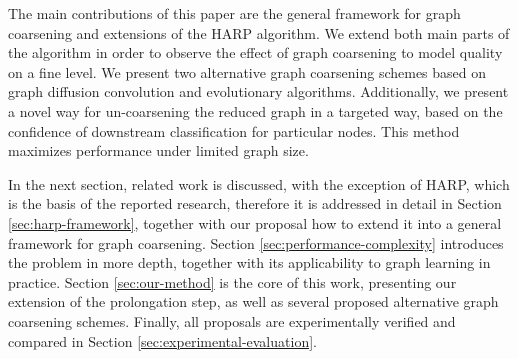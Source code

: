 The main contributions of this paper are the general framework for graph coarsening and extensions of the HARP algorithm. We extend both main parts of the algorithm in order to observe the effect of graph coarsening to model quality on a fine level. We present two alternative graph coarsening schemes based on graph diffusion convolution and evolutionary algorithms. Additionally, we present a novel way for un-coarsening the reduced graph in a targeted way, based on the confidence of downstream classification for particular nodes. This method maximizes performance under limited graph size.

In the next section, related work is discussed, with the exception of HARP, which is the basis of the reported research, therefore it is addressed in detail in Section \ref{sec:harp-framework}, together with our proposal how to extend it into a general framework for graph coarsening. Section \ref{sec:performance-complexity} introduces the problem in more depth, together with its applicability to graph learning in practice. Section \ref{sec:our-method} is the core of this work, presenting our extension of the prolongation step, as well as several proposed alternative graph coarsening schemes. Finally, all proposals are experimentally verified and compared in Section \ref{sec:experimental-evaluation}.
